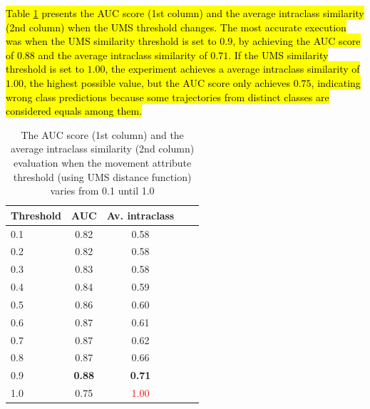 \documentclass[12pt]{article}
\begin{document}
\hl{Table {\ref{tab:sensibility_movement_thresholds}} presents the AUC score (1st column) and the average intraclass similarity (2nd column) when the UMS threshold changes. The most accurate execution was when the UMS similarity threshold is set to $0.9$, by achieving the AUC score of $0.88$ and the average intraclass similarity of $0.71$. If the UMS similarity threshold is set to $1.00$, the experiment achieves a average intraclass similarity of $1.00$, the highest possible value, but the AUC score only achieves $0.75$, indicating wrong class predictions because some trajectories from distinct classes are considered equals among them.}


\begin{table}[ht!]
  \scriptsize
  \centering
  \begin{tabular}{|l|c|c|c|c|}
  	\hline
Threshold & AUC & Av. intraclass\\
  	\hline
0.1 & 0.82 & 0.58\\
0.2 & 0.82 & 0.58\\
0.3 & 0.83 & 0.58\\
0.4 & 0.84 & 0.59\\
0.5 & 0.86 & 0.60\\
0.6 & 0.87 & 0.61\\
0.7 & 0.87 & 0.62\\
0.8 & 0.87 & 0.66\\
0.9 & \textbf{0.88} & \textbf{0.71}\\
1.0 & 0.75 & \textcolor{red}{1.00}\\
    \hline
  \end{tabular}
  \caption{The AUC score (1st column) and the average intraclass similarity (2nd column) evaluation when the movement attribute threshold (using UMS distance function) varies from 0.1 until 1.0}
  \label{tab:sensibility_movement_thresholds}
\end{table}
\end{document}
